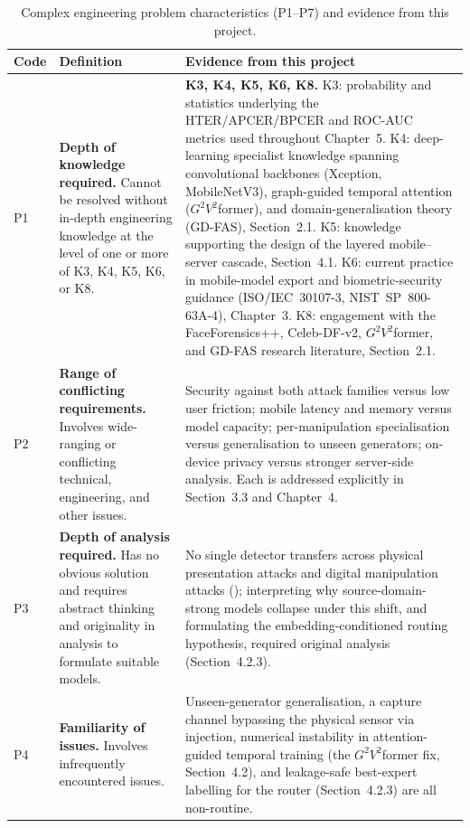 \begin{table}[H]
\centering
\caption{Complex engineering problem characteristics (P1--P7) and evidence from
this project.}
\label{tab:p1p7}
\begin{tabularx}{\textwidth}{@{}p{9mm}p{30mm}Y@{}}
\toprule
Code & Definition & Evidence from this project \\
\midrule
P1 & \textbf{Depth of knowledge required.} Cannot be resolved without in-depth
engineering knowledge at the level of one or more of K3, K4, K5, K6, or K8. &
\textbf{K3, K4, K5, K6, K8.} K3: probability and statistics underlying the
HTER/APCER/BPCER and ROC-AUC metrics used throughout Chapter~5. K4: deep-learning
specialist knowledge spanning convolutional backbones (Xception, MobileNetV3),
graph-guided temporal attention ($G^2V^2$former), and domain-generalisation theory
(GD-FAS), Section~2.1. K5: knowledge supporting the design of the layered
mobile--server cascade, Section~4.1. K6: current practice in mobile-model export
and biometric-security guidance (ISO/IEC~30107-3, NIST~SP~800-63A-4), Chapter~3.
K8: engagement with the FaceForensics++, Celeb-DF-v2, $G^2V^2$former, and GD-FAS
research literature, Section~2.1. \\
P2 & \textbf{Range of conflicting requirements.} Involves wide-ranging or
conflicting technical, engineering, and other issues. & Security against both
attack families versus low user friction; mobile latency and memory versus model
capacity; per-manipulation specialisation versus generalisation to unseen
generators; on-device privacy versus stronger server-side analysis. Each is
addressed explicitly in Section~3.3 and Chapter~4. \\
P3 & \textbf{Depth of analysis required.} Has no obvious solution and requires
abstract thinking and originality in analysis to formulate suitable models. & No
single detector transfers across physical presentation attacks and digital
manipulation attacks (); interpreting why
source-domain-strong models collapse under this shift, and formulating the
embedding-conditioned routing hypothesis, required original analysis
(Section~4.2.3). \\
P4 & \textbf{Familiarity of issues.} Involves infrequently encountered issues. &
Unseen-generator generalisation, a capture channel bypassing the physical sensor
via injection, numerical instability in attention-guided temporal training (the
$G^2V^2$former fix, Section~4.2), and leakage-safe best-expert labelling for the
router (Section~4.2.3) are all non-routine. \\

\end{tabularx}
\end{table}
